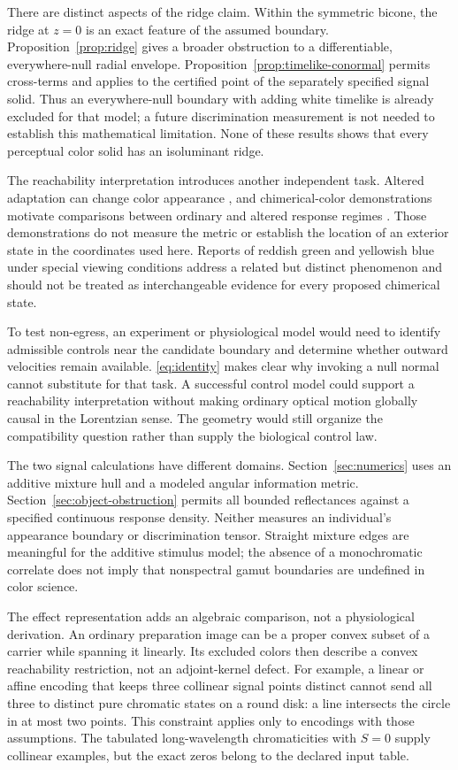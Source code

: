 \documentclass[9pt,twocolumn,twoside]{opticajnl}
\theoremstyle{plain}
\begin{document}
There are distinct aspects of the ridge claim. Within the symmetric bicone, the ridge at $z=0$ is an exact feature of the assumed boundary. Proposition~\ref{prop:ridge} gives a broader obstruction to a differentiable, everywhere-null radial envelope. Proposition~\ref{prop:timelike-conormal} permits cross-terms and applies to the certified point of the separately specified signal solid. Thus an everywhere-null boundary with adding white timelike is already excluded for that model; a future discrimination measurement is not needed to establish this mathematical limitation. None of these results shows that every perceptual color solid has an isoluminant ridge.

The reachability interpretation introduces another independent task. Altered adaptation can change color appearance \cite{Shevell2003,Fairchild2013}, and chimerical-color demonstrations motivate comparisons between ordinary and altered response regimes \cite{Churchland2005}. Those demonstrations do not measure the metric or establish the location of an exterior state in the coordinates used here. Reports of reddish green and yellowish blue under special viewing conditions \cite{Crane1983} address a related but distinct phenomenon and should not be treated as interchangeable evidence for every proposed chimerical state.

To test non-egress, an experiment or physiological model would need to identify admissible controls near the candidate boundary and determine whether outward velocities remain available. \eqref{eq:identity} makes clear why invoking a null normal cannot substitute for that task. A successful control model could support a reachability interpretation without making ordinary optical motion globally causal in the Lorentzian sense. The geometry would still organize the compatibility question rather than supply the biological control law.

The two signal calculations have different domains. Section~\ref{sec:numerics} uses an additive mixture hull and a modeled angular information metric. Section~\ref{sec:object-obstruction} permits all bounded reflectances against a specified continuous response density. Neither measures an individual's appearance boundary or discrimination tensor. Straight mixture edges are meaningful for the additive stimulus model; the absence of a monochromatic correlate does not imply that nonspectral gamut boundaries are undefined in color science.

The effect representation adds an algebraic comparison, not a physiological derivation. An ordinary preparation image can be a proper convex subset of a carrier while spanning it linearly. Its excluded colors then describe a convex reachability restriction, not an adjoint-kernel defect. For example, a linear or affine encoding that keeps three collinear signal points distinct cannot send all three to distinct pure chromatic states on a round disk: a line intersects the circle in at most two points. This constraint applies only to encodings with those assumptions. The tabulated long-wavelength chromaticities with $S=0$ supply collinear examples, but the exact zeros belong to the declared input table.
\end{document}
